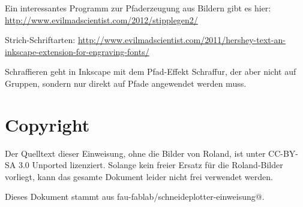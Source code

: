 \documentclass{\basedir/fablab-document}
\begin{document}
Ein interessantes Programm zur Pfaderzeugung aus Bildern gibt es hier: \url{http://www.evilmadscientist.com/2012/stipplegen2/}

Strich-Schriftarten: \url{http://www.evilmadscientist.com/2011/hershey-text-an-inkscape-extension-for-engraving-fonts/}

Schraffieren geht in Inkscape mit dem Pfad-Effekt Schraffur, der aber nicht auf Gruppen, sondern nur direkt auf Pfade angewendet werden muss.

\listoftodos

\newpage
\appendix
\section{Copyright}
Der Quelltext dieser Einweisung, ohne die Bilder von Roland, ist unter CC-BY-SA 3.0 Unported lizenziert. Solange kein freier Ersatz für die Roland-Bilder vorliegt, kann das gesamte Dokument leider nicht frei verwendet werden.

Dieses Dokument stammt aus fau-fablab/schneideplotter-einweisung@\Revision{}.
\end{document}
